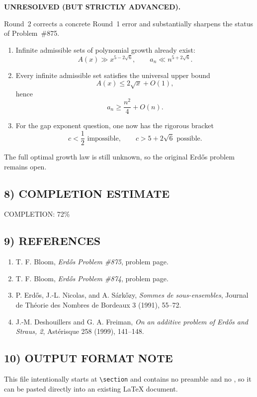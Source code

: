 \textbf{UNRESOLVED (BUT STRICTLY ADVANCED).}

Round~2 corrects a concrete Round~1 error and substantially sharpens the status of Problem~\#875.

\begin{enumerate}
\item Infinite admissible sets of polynomial growth already exist:
\[
A(x)\gg x^{5-2\sqrt 6},\qquad a_n\ll n^{5+2\sqrt 6}.
\]
\item Every infinite admissible set satisfies the universal upper bound
\[
A(x)\le 2\sqrt x+O(1),
\]
hence
\[
a_n\ge \frac{n^2}{4}+O(n).
\]
\item For the gap exponent question, one now has the rigorous bracket
\[
c<\frac12 \text{ impossible},\qquad c>5+2\sqrt 6 \text{ possible}.
\]
\end{enumerate}

The full optimal growth law is still unknown, so the original Erd\H{o}s problem remains open.

\subsection*{8) COMPLETION ESTIMATE}

COMPLETION: 72\%

\subsection*{9) REFERENCES}

\begin{enumerate}
\item T. F. Bloom, \emph{Erd\H{o}s Problem \#875}, problem page.
\item T. F. Bloom, \emph{Erd\H{o}s Problem \#874}, problem page.
\item P. Erd\H{o}s, J.-L. Nicolas, and A. S\'ark\H{o}zy, \emph{Sommes de sous-ensembles}, Journal de Th\'eorie des Nombres de Bordeaux 3 (1991), 55--72.
\item J.-M. Deshouillers and G. A. Freiman, \emph{On an additive problem of Erd\H{o}s and Straus, 2}, Ast\'erisque 258 (1999), 141--148.
\end{enumerate}

\subsection*{10) OUTPUT FORMAT NOTE}

This file intentionally starts at \verb|\section| and contains no preamble and no \verb||, so it can be pasted directly into an existing LaTeX document.
